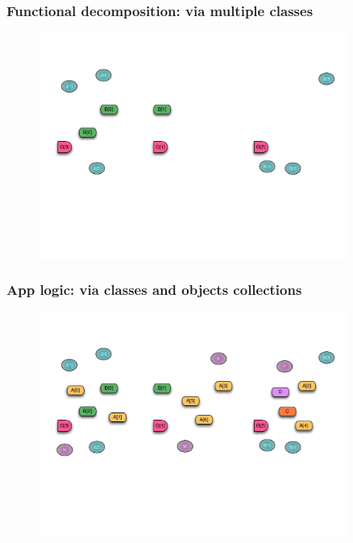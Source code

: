 \begin{frame}
  \frametitle{Functional decomposition: via multiple classes}
  \begin{figure}\includegraphics[width=0.9\textwidth]{../figures/progmodel/04-func-decomp-via-classes.pdf}\end{figure}
\end{frame}


\begin{frame}
  \frametitle{App logic: via classes and objects collections}
  \begin{figure}\includegraphics[width=0.9\textwidth]{../figures/progmodel/05-parallelism-via-obj-collections.pdf}\end{figure}
\end{frame}


